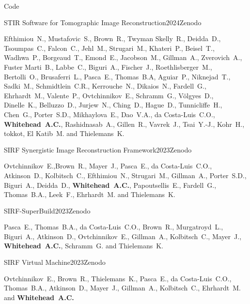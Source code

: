 \documentclass{cv}
\begin{document}
    \begin{rSection}{Code}
        \item \begin{rSubsection}{STIR Software for Tomographic Image Reconstruction}{2024}{Zenodo}{}
            \item Efthimiou~N., Mustafovic~S., Brown~R., Twyman Skelly~R., Deidda~D., Tsoumpas~C., Falcon~C., Jehl~M., Strugari~M., Khateri~P., Beisel~T., Wadhwa~P., Borgeaud~T., Emond~E., Jacobson~M., Gillman~A., Zverovich~A., Fuster Marti~B., Labbe~C., Biguri~A., Fischer~J., Roethlisberger~M., Bertolli~O., Brusaferri~L., Pasca~E., Thomas~B.A, Aguiar~P., Niknejad~T., Sadki~M., Schmidtlein~C.R., Kerrouche~N., Dikaios~N., Fardell~G., Ehrhardt~M., Valente~P., Ovtchinnikov~E., Schramm~G., Völgyes~D., Dinelle~K., Belluzzo~D., Jurjew~N., Ching~D., Hague~D., Tunnicliffe~H., Chen~G., Porter~S.D., Mikhaylova~E., Dao~V.A., da Costa-Luis~C.O., {\bf Whitehead~A.C.}, Rashidnasab~A., Gillen~R., Vavrek~J., Tsai~Y.-J., Kohr~H., tokkot, El Katib~M. and Thielemans~K.
        \end{rSubsection}
        
        \item \begin{rSubsection}{SIRF Synergistic Image Reconstruction Framework}{2023}{Zenodo}{}
            \item Ovtchinnikov~E.,Brown~R., Mayer~J., Pasca~E., da Costa-Luis~C.O., Atkinson~D., Kolbitsch~C., Efthimiou~N., Strugari~M., Gillman~A., Porter~S.D., Biguri~A., Deidda~D., {\bf Whitehead~A.C.}, Papoutsellis~E., Fardell~G., Thomas~B.A., Leek~F., Ehrhardt~M. and Thielemans~K.
        \end{rSubsection}

        \item \begin{rSubsection}{SIRF-SuperBuild}{2023}{Zenodo}{}
            \item Pasca~E., Thomas~B.A., da Costa-Luis~C.O., Brown~R., Murgatroyd~L., Biguri~A., Atkinson~D., Ovtchinnikov~E., Gillman~A., Kolbitsch~C., Mayer~J., {\bf Whitehead~A.C.}, Schramm~G. and Thielemans~K.
        \end{rSubsection}
        
        \item \begin{rSubsection}{SIRF Virtual Machine}{2023}{Zenodo}{}
            \item Ovtchinnikov~E., Brown~R., Thielemans~K., Pasca~E., da Costa-Luis~C.O., Thomas~B.A., Atkinson~D., Mayer~J., Gillman~A., Kolbitsch~C., Ehrhardt~M. and {\bf Whitehead~A.C.}
        \end{rSubsection}
    \end{rSection}
\end{document}
